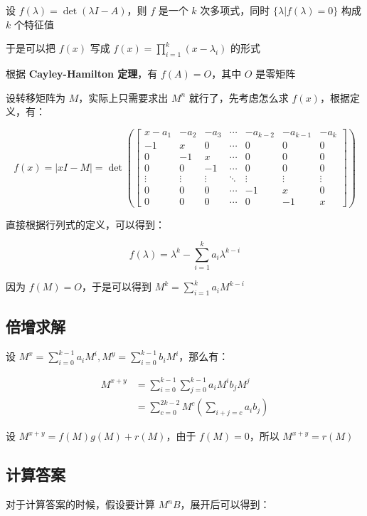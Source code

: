 \documentclass[UTF8]{article}
\begin{document}
设 $f(\lambda)=\det(\lambda I-A)$，则 $f$ 是一个 $k$ 次多项式，同时 $\{\lambda|f(\lambda)=0\}$ 构成 $k$ 个特征值

于是可以把 $f(x)$ 写成 $f(x)=\prod_{i=1}^{k}(x-\lambda_i)$ 的形式

根据 \textbf{Cayley-Hamilton 定理}，有 $f(A)=O$，其中 $O$ 是零矩阵

设转移矩阵为 $M$，实际上只需要求出 $M^n$ 就行了，先考虑怎么求 $f(x)$，根据定义，有：

$$
f(x) = |x I - M| = 
\det\left(
\begin{bmatrix} 
    x- a _ 1 & -a _ 2 & -a _ 3 & \cdots & -a _ {k - 2} & -a _ {k - 1} & -a _ k \\
    -1 & x & 0 & \cdots & 0 & 0 & 0 \\
    0 & -1 & x & \cdots & 0 & 0 & 0 \\
    0 & 0 & -1 & \cdots & 0 & 0 & 0 \\
    \vdots & \vdots & \vdots & \ddots & \vdots & \vdots & \vdots \\
    0 & 0 & 0 & \cdots & -1 & x & 0 \\
    0 & 0& 0 & \cdots & 0 & -1 & x
\end{bmatrix}
\right)
$$

直接根据行列式的定义，可以得到：

$$
f(\lambda)=\lambda^{k}-\sum_{i=1}^{k}a_i\lambda^{k-i}
$$

因为 $f(M)=O$，于是可以得到 $M^k=\sum_{i=1}^{k}a_iM^{k-i}$

\subsection{倍增求解}

设 $M^x=\sum_{i=0}^{k-1}a_iM^{i},M^y=\sum_{i=0}^{k-1}b_iM^{i}$，那么有：

$$
\begin{aligned}
M^{x+y}
&= \sum_{i=0}^{k-1}\sum_{j=0}^{k-1}a_iM^{i}b_jM^{j} \\
&= \sum_{c=0}^{2k-2}M^{c} \left(\sum_{i+j=c}a_ib_j\right)
\end{aligned}
$$

设 $M^{x+y}=f(M)g(M)+r(M)$，由于 $f(M)=0$，所以 $M^{x+y}=r(M)​$

\subsection{计算答案}

对于计算答案的时候，假设要计算 $M^nB$，展开后可以得到：
\end{document}
